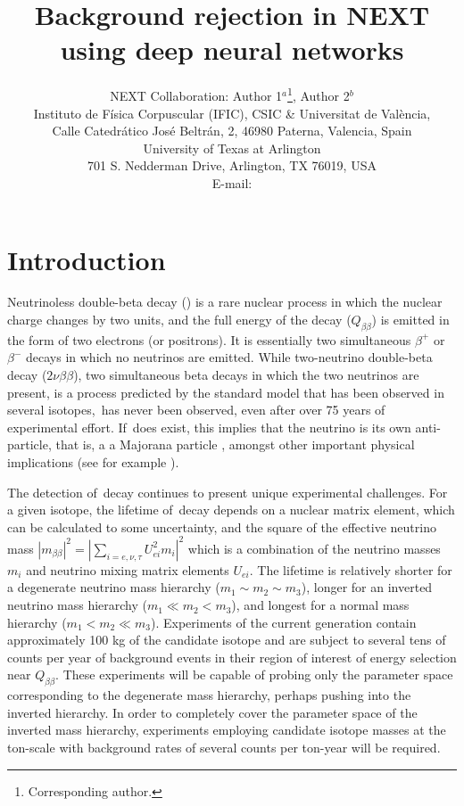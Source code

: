 \documentclass{JINST}
\title{Background rejection in NEXT using deep neural networks}
\author{NEXT Collaboration: Author 1$^a$\thanks{Corresponding author.},
Author 2$^b$\\
\llap{$^a$}Instituto de F\'isica Corpuscular (IFIC), CSIC \& Universitat de Val\`encia,\\ 
Calle Catedr\'atico Jos\'e Beltr\'an, 2, 46980 Paterna, Valencia, Spain\\
\llap{$^b$}University of Texas at Arlington\\
 701 S. Nedderman Drive, Arlington, TX 76019, USA\\
E-mail: \email{correspodingauthor@ific.uv.es}\\}
\begin{document}
\section{Introduction}\label{sec:intro}
\noindent Neutrinoless double-beta decay (\bbonu) is a rare nuclear process in which the nuclear charge changes by two units, and the full energy of the decay ($Q_{\beta\beta}$) is 
emitted in the form of two electrons (or positrons).  It is essentially two simultaneous $\beta^{+}$ or $\beta^{-}$ decays in which no neutrinos are emitted.  While two-neutrino double-beta 
decay ($2\nu\beta\beta$), two simultaneous beta decays in which the two neutrinos are present, is a process predicted by the standard model that has been observed in several isotopes, 
\bbonu\,has never been observed, even after over 75 years of experimental effort.  If \bbonu\,does exist, this implies that the neutrino is its own anti-particle, that is, a
a Majorana particle \cite{Schechter_1982}, amongst other important physical implications (see for example \cite{GomezCadenas:2013ue, Cadenas_2012, Avignone_2008}).

The detection of \bbonu\,decay continues to present unique experimental challenges.  For a given isotope, the lifetime of \bbonu\,decay depends on a nuclear matrix element, 
which can be calculated to some uncertainty, and the square of the effective neutrino mass $|m_{\beta\beta}|^2 = |\sum_{i=e,\nu,\tau}U_{ei}^2m_{i}|^2$ which is a combination of the neutrino
masses $m_{i}$ and neutrino mixing matrix elements $U_{ei}$.  The lifetime is relatively shorter for a degenerate neutrino mass hierarchy ($m_1 \sim m_2 \sim m_3$), longer for an inverted 
neutrino mass hierarchy ($m_1 \ll m_2 < m_3$), and longest for a normal mass hierarchy ($m_1 < m_2 \ll m_3$).  Experiments of the current generation contain approximately
100 kg of the candidate isotope and are subject to several tens of counts per year of background events in their region of interest of energy selection near $Q_{\beta\beta}$.  These experiments
will be capable of probing only the parameter space corresponding to the degenerate mass hierarchy, perhaps pushing into the inverted hierarchy.  In order to completely cover the parameter 
space of the inverted mass hierarchy, experiments employing candidate isotope masses at the ton-scale with background rates of several counts per ton-year will be required.  
\end{document}
